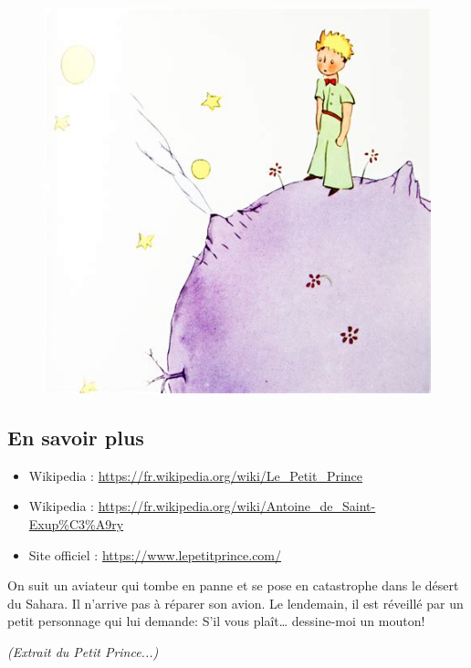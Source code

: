 \begin{multicols}{2}

  \begin{figure}[H]
    \centering
    \includegraphics[width=0.8\linewidth]{4x5-calcul-litteral/pp.png}
  \end{figure}

\subsection*{En savoir plus}

\begin{itemize}
\item Wikipedia : \url{https://fr.wikipedia.org/wiki/Le_Petit_Prince}
\item Wikipedia : \url{https://fr.wikipedia.org/wiki/Antoine_de_Saint-Exup%C3%A9ry}
\item Site officiel : \url{https://www.lepetitprince.com/}
\end{itemize}


On suit un aviateur qui tombe en panne et se pose en catastrophe dans le désert du Sahara. Il n’arrive pas à réparer son avion. Le lendemain, il est réveillé par un petit personnage qui lui demande: \og S'il vous plaît… dessine-moi un mouton! \fg 

\end{multicols}

\newpage

\textit{(Extrait du Petit Prince...)}

